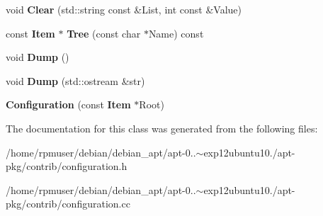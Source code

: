 \begin{DoxyCompactItemize}
\item 
void {\bfseries \-Clear} (std\-::string const \&\-List, int const \&\-Value)\label{classConfiguration_a2c9d5bbe2426dd5fa2b38f7323d70cd8}

\item 
const {\bf \-Item} $\ast$ {\bfseries \-Tree} (const char $\ast$\-Name) const \label{classConfiguration_a48f29adb8ef9215ae99ff0fb25498712}

\item 
void {\bfseries \-Dump} ()\label{classConfiguration_a793169e06e9183e678805ce0663b6000}

\item 
void {\bfseries \-Dump} (std\-::ostream \&str)\label{classConfiguration_a70b2730c72d8c133ff3acca2fd366d59}

\item 
{\bfseries \-Configuration} (const {\bf \-Item} $\ast$\-Root)\label{classConfiguration_aa7589283aa8058ca4c15e27bcff331aa}

\end{DoxyCompactItemize}


\-The documentation for this class was generated from the following files\-:\begin{DoxyCompactItemize}
\item 
/home/rpmuser/debian/debian\-\_\-apt/apt-\/0..$\sim$exp12ubuntu10./apt-\/pkg/contrib/configuration.\-h\item 
/home/rpmuser/debian/debian\-\_\-apt/apt-\/0..$\sim$exp12ubuntu10./apt-\/pkg/contrib/configuration.\-cc\end{DoxyCompactItemize}
